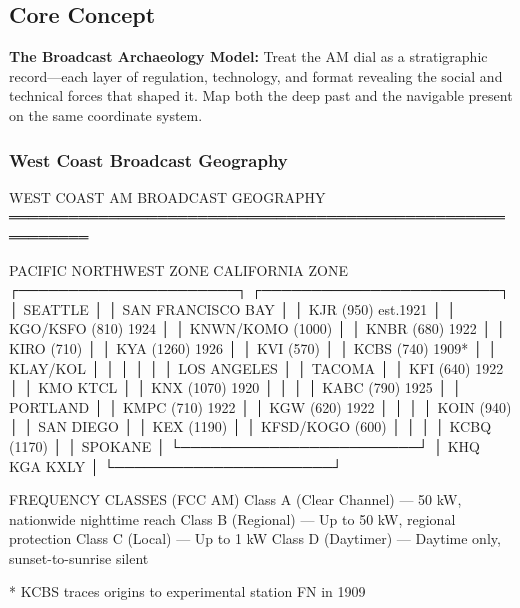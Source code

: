 \documentclass[11pt,letterpaper]{article}
\begin{document}
\subsection{Core Concept}

\textbf{The Broadcast Archaeology Model:} Treat the AM dial as a stratigraphic record---each
layer of regulation, technology, and format revealing the social and technical forces that shaped
it. Map both the deep past and the navigable present on the same coordinate system.

\subsubsection{West Coast Broadcast Geography}

\begin{asciibox}
WEST COAST AM BROADCAST GEOGRAPHY
══════════════════════════════════════════════════════════

  PACIFIC NORTHWEST ZONE                 CALIFORNIA ZONE
  ┌──────────────────────┐              ┌────────────────────────┐
  │  SEATTLE             │              │  SAN FRANCISCO BAY     │
  │  KJR (950) est.1921  │              │  KGO/KSFO (810) 1924   │
  │  KNWN/KOMO (1000)    │              │  KNBR (680) 1922       │
  │  KIRO (710)          │              │  KYA (1260) 1926       │
  │  KVI (570)           │              │  KCBS (740) 1909*      │
  │  KLAY/KOL            │              │                        │
  │                      │              │  LOS ANGELES           │
  │  TACOMA              │              │  KFI (640) 1922        │
  │  KMO  KTCL           │              │  KNX (1070) 1920       │
  │                      │              │  KABC (790) 1925       │
  │  PORTLAND            │              │  KMPC (710) 1922       │
  │  KGW (620) 1922      │              │                        │
  │  KOIN (940)          │              │  SAN DIEGO             │
  │  KEX (1190)          │              │  KFSD/KOGO (600)       │
  │                      │              │  KCBQ (1170)           │
  │  SPOKANE             │              └────────────────────────┘
  │  KHQ  KGA  KXLY      │
  └──────────────────────┘

  FREQUENCY CLASSES (FCC AM)
  Class A (Clear Channel) — 50 kW, nationwide nighttime reach
  Class B (Regional)      — Up to 50 kW, regional protection
  Class C (Local)         — Up to 1 kW
  Class D (Daytimer)      — Daytime only, sunset-to-sunrise silent

  * KCBS traces origins to experimental station FN in 1909
\end{asciibox}
\end{document}

